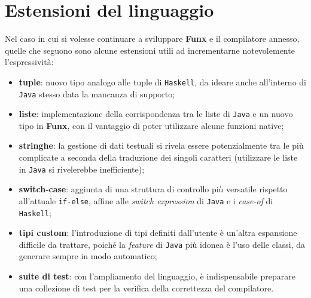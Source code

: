 \section{Estensioni del linguaggio}
\label{sec:6-2-language-extensions}

Nel caso in cui si volesse continuare a sviluppare \textbf{Funx} e il compilatore annesso,
quelle che seguono sono alcune estensioni utili ad incrementarne notevolemente l'espressività:
\begin{itemize}
    \item \textbf{tuple}: nuovo tipo analogo alle tuple di \texttt{Haskell}, da ideare anche all'interno di \texttt{Java}
          stesso data la mancanza di supporto;
    \item \textbf{liste}: implementazione della corrispondenza tra le liste di \texttt{Java} e un nuovo tipo in \textbf{Funx},
          con il vantaggio di poter utilizzare alcune funzioni native;
    \item \textbf{stringhe}: la gestione di dati testuali si rivela essere potenzialmente tra le più complicate a seconda
          della traduzione dei singoli caratteri (utilizzare le liste in \texttt{Java} si rivelerebbe inefficiente);
    \item \textbf{switch-case}: aggiunta di una struttura di controllo più versatile rispetto all'attuale \texttt{if-else},
          affine alle \textit{switch expression} di \texttt{Java} e i \textit{case-of} di \texttt{Haskell};
    \item \textbf{tipi custom}: l'introduzione di tipi definiti dall'utente è un'altra espansione difficile da trattare,
          poiché la \textit{feature} di \texttt{Java} più idonea è l'uso delle classi, da generare sempre in modo automatico;
    \item \textbf{suite di test}: con l'ampliamento del linguaggio, è indispensabile preparare una collezione di test
          per la verifica della correttezza del compilatore.
\end{itemize}